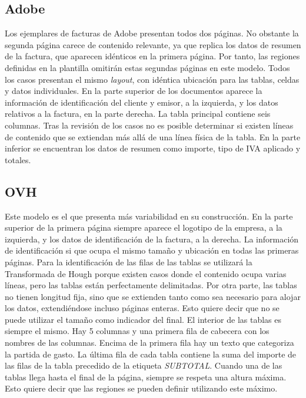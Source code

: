 \subsection{Adobe}

Los ejemplares de facturas de Adobe presentan todos dos páginas. No obstante la segunda página carece de contenido relevante, ya que replica los datos de resumen de la factura, que aparecen idénticos en la primera página. Por tanto, las regiones definidas en la plantilla omitirán estas segundas páginas en este modelo.
Todos los casos presentan el mismo \emph{layout}, con idéntica ubicación para las tablas, celdas y datos individuales. En la parte superior de los documentos aparece la información de identificación del cliente y emisor, a la izquierda, y los datos relativos a la factura, en la parte derecha.
La tabla principal contiene seis columnas. Tras la revisión de los casos no es posible determinar si existen líneas de contenido que se extiendan más allá de una línea física de la tabla.
En la parte inferior se encuentran los datos de resumen como importe, tipo de IVA aplicado y totales.

\subsection{OVH}

Este modelo es el que presenta más variabilidad en su construcción. En la parte superior de la primera página siempre aparece el logotipo de la empresa, a la izquierda, y los datos de identificación de la factura, a la derecha. La información de identificación si que ocupa el mismo tamaño y ubicación en todas las primeras páginas. Para la identificación de las filas de las tablas se utilizará la Transformada de Hough porque existen casos donde el contenido ocupa varias líneas, pero las tablas están perfectamente delimitadas. Por otra parte, las tablas no tienen longitud fija, sino que se extienden tanto como sea necesario para alojar los datos, extendiéndose incluso páginas enteras. Esto quiere decir que no se puede utilizar el tamaño como indicador del final. El interior de las tablas es siempre el mismo. Hay 5 columnas y una primera fila de cabecera con los nombres de las columnas. Encima de la primera fila hay un texto que categoriza la partida de gasto. La última fila de cada tabla contiene la suma del importe de las filas de la tabla precedido de la etiqueta \emph{SUBTOTAL}. Cuando una de las tablas llega hasta el final de la página, siempre se respeta una altura máxima. Esto quiere decir que las regiones se pueden definir utilizando este máximo.

